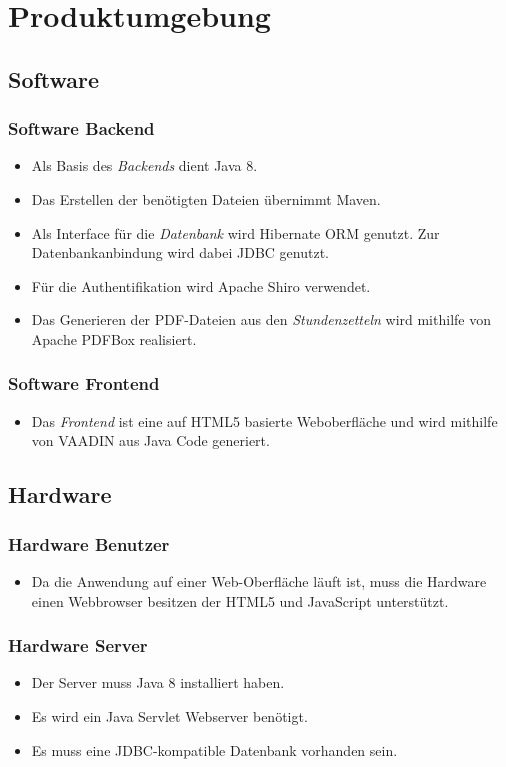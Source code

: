 \section{Produktumgebung}

\subsection{Software}
\subsubsection{Software Backend}
\begin{itemize}
    \item Als Basis des \emph{Backends} dient Java 8.
    \item Das Erstellen der benötigten Dateien übernimmt Maven.
    \item Als Interface für die \emph{Datenbank} wird Hibernate ORM genutzt.
            Zur Datenbankanbindung wird dabei JDBC genutzt.
    \item Für die Authentifikation wird Apache Shiro verwendet.
    \item Das Generieren der PDF-Dateien aus den \emph{Stundenzetteln} wird mithilfe von Apache PDFBox realisiert.
\end{itemize}

\subsubsection{Software Frontend}
\begin{itemize}
    \item Das \emph{Frontend} ist eine auf HTML5 basierte Weboberfläche und wird mithilfe von VAADIN aus Java Code generiert.
\end{itemize}

\subsection{Hardware}
\subsubsection{Hardware Benutzer}
\begin{itemize}
    \item Da die Anwendung auf einer Web-Oberfläche läuft ist, muss die Hardware einen Webbrowser besitzen der HTML5 und JavaScript unterstützt.
\end{itemize}

\subsubsection{Hardware Server}
\begin{itemize}
    \item Der Server muss Java 8 installiert haben.
    \item Es wird ein Java Servlet Webserver benötigt.
    \item Es muss eine JDBC-kompatible Datenbank vorhanden sein.
\end{itemize}
